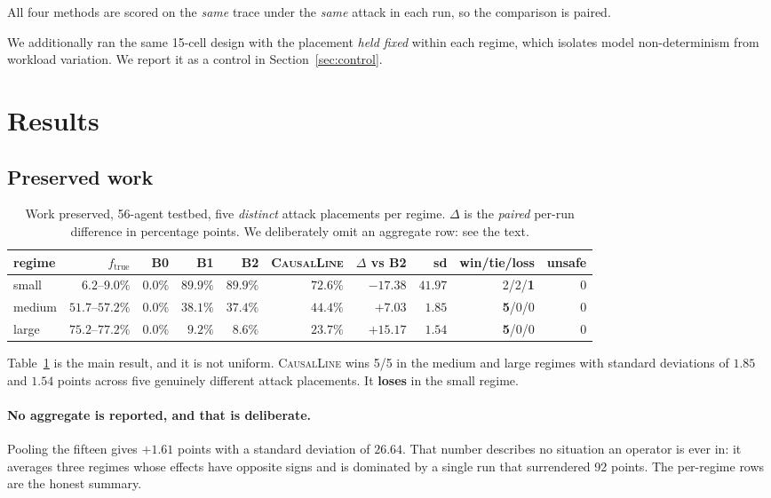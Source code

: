 \documentclass[10pt,twocolumn]{article}
\newcommand{\sys}{\textsc{CausalLine}}
\newcommand{\bzero}{\textsf{B0}}
\newcommand{\bone}{\textsf{B1}}
\newcommand{\btwo}{\textsf{B2}}
\begin{document}
All four methods are scored on the \emph{same} trace under the \emph{same}
attack in each run, so the comparison is paired.

We additionally ran the same 15-cell design with the placement \emph{held
fixed} within each regime, which isolates model non-determinism from workload
variation. We report it as a control in Section~\ref{sec:control}.

\section{Results}

\subsection{Preserved work}

\begin{table}[t]
\centering
\small
\begin{tabular}{lrrrrrrrrr}
\toprule
regime & $f_{\text{true}}$ & \bzero{} & \bone{} & \btwo{} & \sys{} &
$\Delta$ vs \btwo{} & sd & win/tie/loss & unsafe \\
\midrule
small  & $6.2$--$9.0\%$  & $0.0\%$ & $89.9\%$ & $89.9\%$ & $72.6\%$ & $\mathbf{-17.38}$ & $41.97$ & 2/2/\textbf{1} & 0 \\
medium & $51.7$--$57.2\%$ & $0.0\%$ & $38.1\%$ & $37.4\%$ & $\mathbf{44.4\%}$ & $\mathbf{+7.03}$ & $1.85$ & \textbf{5}/0/0 & 0 \\
large  & $75.2$--$77.2\%$ & $0.0\%$ & $9.2\%$ & $8.6\%$ & $\mathbf{23.7\%}$ & $\mathbf{+15.17}$ & $1.54$ & \textbf{5}/0/0 & 0 \\
\bottomrule
\end{tabular}
\caption{Work preserved, 56-agent testbed, five \emph{distinct} attack
placements per regime. $\Delta$ is the \emph{paired} per-run difference in
percentage points. We deliberately omit an aggregate row: see the text.}
\label{tab:main}
\end{table}

Table~\ref{tab:main} is the main result, and it is not uniform. \sys{} wins
5/5 in the medium and large regimes with standard deviations of $1.85$ and
$1.54$ points across five genuinely different attack placements. It
\textbf{loses} in the small regime.

\paragraph{No aggregate is reported, and that is deliberate.}
Pooling the fifteen gives $+1.61$ points with a standard deviation of $26.64$.
That number describes no situation an operator is ever in: it averages three
regimes whose effects have opposite signs and is dominated by a single run
that surrendered 92 points. The per-regime rows are the honest summary.
\end{document}
